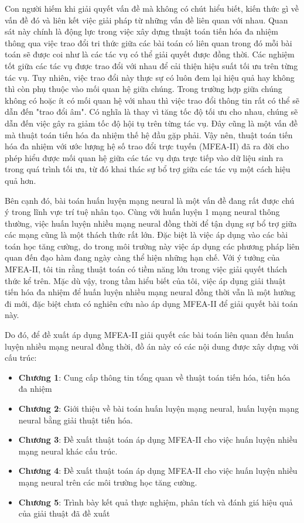Con người hiếm khi giải quyết vấn đề mà không có chút hiểu biết, kiến thức gì về vấn đề đó và liên kết việc giải pháp từ những vấn đề liên quan với nhau. Quan sát này chính là động lực trong việc xây dựng thuật toán tiến hóa đa nhiệm thông qua việc trao đổi tri thức giữa các bài toán có liên quan trong đó mỗi bài toán sẽ được coi như là các tác vụ có thể giải quyết được đồng thời. Các nghiệm tốt giữa các tác vụ được trao đổi với nhau để cải thiện hiệu suất tối ưu trên từng tác vụ. Tuy nhiên, việc trao đổi này thực sự có luôn đem lại hiệu quả hay không thì còn phụ thuộc vào mối quan hệ giữa chúng.
Trong trường hợp giữa chúng không có hoặc ít có mối quan hệ với nhau thì việc trao đổi thông tin rất có thể sẽ dẫn đến "trao đổi âm". Có nghĩa là thay vì tăng tốc độ tối ưu cho nhau, chúng sẽ dẫn đến việc gây ra giảm tốc độ hội tụ trên từng tác vụ. Đây cũng là một vấn đề mà thuật toán tiến hóa đa nhiệm thế hệ đầu gặp phải. Vậy nên, thuật toán tiến hóa đa nhiệm với ước lượng hệ số trao đổi trực tuyến (MFEA-II) đã ra đời cho phép hiểu được mối quan hệ giữa các tác vụ dựa trực tiếp vào dữ liệu sinh ra trong quá trình tối ưu, từ đó khai thác sự bổ trợ giữa các tác vụ một cách hiệu quả hơn. 

Bên cạnh đó, bài toán huấn luyện mạng neural là một vấn đề đang rất được chú ý trong lĩnh vực trí tuệ nhân tạo. Cùng với huấn luyện 1 mạng neural thông thường, việc huấn luyện nhiều mạng neural đồng thời để tận dụng sự bổ trợ giữa các mạng cũng là một thách thức rất lớn. Đặc biệt là việc áp dụng vào các bài toán học tăng cường, do trong môi trường này việc áp dụng các phương pháp liên quan đến đạo hàm đang ngày càng thể hiện những hạn chế.
Với ý tưởng của MFEA-II, tôi tin rằng thuật toán có tiềm năng lớn trong việc giải quyết thách thức kể trên. Mặc dù vậy, trong tầm hiểu biết của tôi, việc áp dụng giải thuật tiến hóa đa nhiệm để huấn luyện nhiều mạng neural đồng thời vẫn là một hướng đi mới, đặc biệt chưa có nghiên cứu nào áp dụng MFEA-II để giải quyết bài toán này. 

Do đó, để đề xuất áp dụng MFEA-II giải quyết các bài toán liên quan đến huấn luyện nhiều mạng neural đồng thời, đồ án này có các nội dung được xây dựng với cấu trúc:
\begin{itemize}
  \item \textbf{Chương 1}: Cung cấp thông tin tổng quan về thuật toán tiến hóa, tiến hóa đa nhiệm
  \item \textbf{Chương 2}: Giới thiệu về bài toán huấn luyện mạng neural, huấn luyện mạng neural bằng giải thuật tiến hóa.
  \item \textbf{Chương 3}: Đề xuất thuật toán áp dụng MFEA-II cho việc huấn luyện nhiều mạng neural khác cấu trúc.
  \item \textbf{Chương 4}: Đề xuất thuật toán áp dụng MFEA-II cho việc huấn luyện nhiều mạng neural trên các môi trường học tăng cường.
  \item \textbf{Chương 5}: Trình bày kết quả thực nghiệm, phân tích và đánh giá hiệu quả của giải thuật đã đề xuất
\end{itemize}

\pagebreak